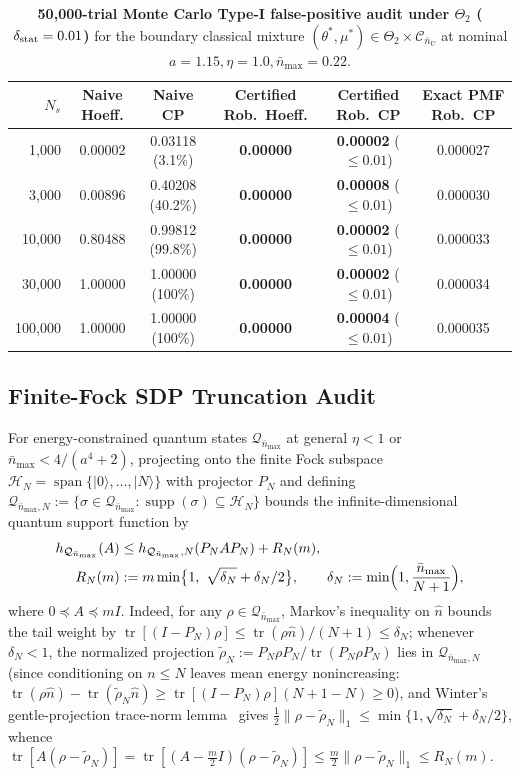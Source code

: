 \documentclass{iopjournal}
\newcommand{\tr}{\operatorname{tr}}
\newcommand{\Cset}{\mathcal{C}}
\newcommand{\Qset}{\mathcal{Q}}
\newcommand{\nbar}{\bar n_{\max}}
\newcommand{\nU}{\bar n_U}
\newcommand{\ket}[1]{\lvert #1\rangle}
\newcommand{\norm}[1]{\lVert #1\rVert}
\newcommand{\I}{I}
\begin{document}
\begin{table}[t]
\centering
\caption{\textbf{50,000-trial Monte Carlo Type-I false-positive audit under $\Theta_2$ ($\delta_{\rm stat}=0.01$)} for the boundary classical mixture $(\theta^*,\mu^*) \in \Theta_2 \times \Cset_{\nU}$ at nominal $a=1.15, \eta=1.0, \nbar=0.22$.}
\label{tab:mc-audit}
\fontsize{8}{10}\selectfont
\setlength{\tabcolsep}{3.5pt}
\begin{tabular}{@{}rccccc@{}}
\toprule
$N_s$ & Naive Hoeff. & Naive CP & \textbf{Certified Rob.\ Hoeff.} & \textbf{Certified Rob.\ CP} & Exact PMF Rob.\ CP \\
\midrule
1,000 & 0.00002 & 0.03118 (3.1\%) & \textbf{0.00000} & \textbf{0.00002} ($\le 0.01$) & 0.000027 \\
3,000 & 0.00896 & 0.40208 (40.2\%) & \textbf{0.00000} & \textbf{0.00008} ($\le 0.01$) & 0.000030 \\
10,000 & 0.80488 & 0.99812 (99.8\%) & \textbf{0.00000} & \textbf{0.00002} ($\le 0.01$) & 0.000033 \\
30,000 & 1.00000 & 1.00000 (100\%) & \textbf{0.00000} & \textbf{0.00002} ($\le 0.01$) & 0.000034 \\
100,000 & 1.00000 & 1.00000 (100\%) & \textbf{0.00000} & \textbf{0.00004} ($\le 0.01$) & 0.000035 \\
\bottomrule
\end{tabular}
\end{table}

\newpage
\subsection{Finite-Fock SDP Truncation Audit}\label{app:fock-audit}

For energy-constrained quantum states $\Qset_{\nbar}$ at general $\eta < 1$ or $\nbar < 4/(a^4+2)$, projecting onto the finite Fock subspace $\mathcal{H}_N = \operatorname{span}\{\ket{0},\dots,\ket{N}\}$ with projector $P_N$ and defining $\Qset_{\nbar,N} := \{\sigma \in \Qset_{\nbar} : \operatorname{supp}(\sigma)\subseteq\mathcal{H}_N\}$ bounds the infinite-dimensional quantum support function by
\begin{align}\label{eq:fock-sdp-tail}
h_{\Qset_{\nbar}}(A) &\le h_{\Qset_{\nbar}, N}(P_N A P_N) + R_N(m), \\
R_N(m) &:= m\min\bigl\{1,\ \sqrt{\delta_N} + \delta_N/2\bigr\}, \qquad
\delta_N := \min\Bigl(1, \frac{\nbar}{N+1}\Bigr), \nonumber
\end{align}
where $0 \preceq A \preceq m\I$. Indeed, for any $\rho \in \Qset_{\nbar}$, Markov's inequality on $\hat n$ bounds the tail weight by $\tr[(\I - P_N)\rho] \le \tr(\rho\hat n)/(N+1) \le \delta_N$; whenever $\delta_N < 1$, the normalized projection $\tilde\rho_N := P_N\rho P_N / \tr(P_N\rho P_N)$ lies in $\Qset_{\nbar,N}$ (since conditioning on $n \le N$ leaves mean energy nonincreasing: $\tr(\rho\hat n) - \tr(\tilde\rho_N\hat n) \ge \tr[(\I - P_N)\rho](N+1 - N) \ge 0$), and Winter's gentle-projection trace-norm lemma~\cite{Winter1999} gives $\frac{1}{2}\norm{\rho - \tilde\rho_N}_1 \le \min\{1, \sqrt{\delta_N} + \delta_N/2\}$, whence $\tr[A(\rho - \tilde\rho_N)] = \tr[(A - \frac{m}{2}\I)(\rho - \tilde\rho_N)] \le \frac{m}{2}\norm{\rho - \tilde\rho_N}_1 \le R_N(m)$.
\end{document}
